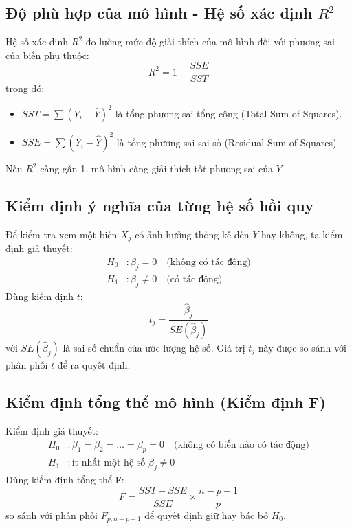 \subsection{Độ phù hợp của mô hình - Hệ số xác định $R^2$}
Hệ số xác định $R^2$ đo lường mức độ giải thích của mô hình đối với phương sai của biến phụ thuộc:
\begin{equation}
    R^2 = 1 - \frac{SSE}{SST}
\end{equation}
trong đó:
\begin{itemize}
    \item $SST = \sum(Y_i - \bar{Y})^2$ là tổng phương sai tổng cộng (Total Sum of Squares).
    \item $SSE = \sum(Y_i - \hat{Y})^2$ là tổng phương sai sai số (Residual Sum of Squares).
\end{itemize}
Nếu $R^2$ càng gần 1, mô hình càng giải thích tốt phương sai của $Y$.

\subsection{Kiểm định ý nghĩa của từng hệ số hồi quy}
Để kiểm tra xem một biến $X_j$ có ảnh hưởng thống kê đến $Y$ hay không, ta kiểm định giả thuyết:
\begin{align*}
    H_0 &: \beta_j = 0 \quad \text{(không có tác động)} \\
    H_1 &: \beta_j \neq 0 \quad \text{(có tác động)}
\end{align*}
Dùng kiểm định $t$:
\begin{equation}
    t_j = \frac{\hat{\beta}_j}{SE(\hat{\beta}_j)}
\end{equation}
\noindent với $SE(\hat{\beta}_j)$ là sai số chuẩn của ước lượng hệ số. Giá trị $t_j$ này được so sánh với phân phối $t$ để ra quyết định.

\subsection{Kiểm định tổng thể mô hình (Kiểm định F)}
Kiểm định giả thuyết:
\begin{align*}
    H_0 &: \beta_1 = \beta_2 = \dots = \beta_p = 0 \quad \text{(không có biến nào có tác động)} \\
    H_1 &: \text{ít nhất một hệ số } \beta_j \neq 0
\end{align*}
Dùng kiểm định tổng thể F:
\begin{equation}
    F = \frac{SST - SSE}{SSE} \times \frac{n - p - 1}{p}
\end{equation}
so sánh với phân phối $F_{p,n-p-1}$ để quyết định giữ hay bác bỏ $H_0$.


